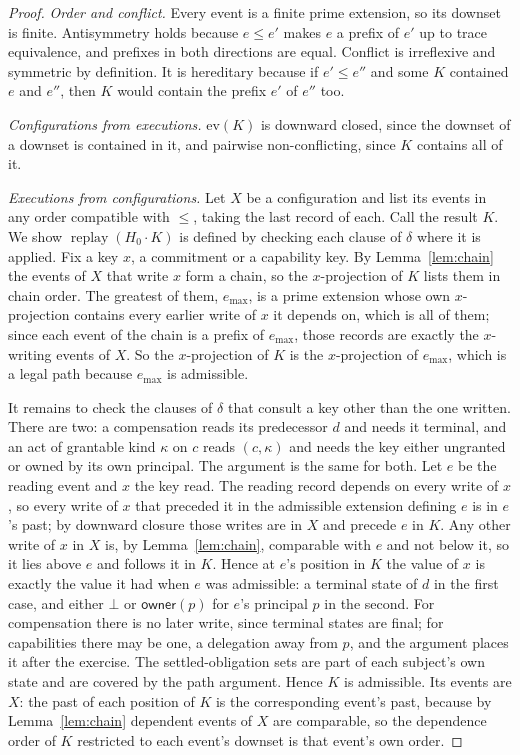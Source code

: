 \documentclass[11pt,openany]{book}
\theoremstyle{remark}
\newcommand{\replay}{\operatorname{replay}}
\begin{document}
\begin{proof}
\emph{Order and conflict.} Every event is a finite prime extension, so its
downset is finite. Antisymmetry holds because $e\le e'$ makes $e$ a
prefix of $e'$ up to trace equivalence, and prefixes in both directions
are equal. Conflict is irreflexive and symmetric by definition. It is
hereditary because if $e'\le e''$ and some $K$ contained $e$ and $e''$,
then $K$ would contain the prefix $e'$ of $e''$ too.

\emph{Configurations from executions.} $\mathrm{ev}(K)$ is downward closed,
since the downset of a downset is contained in it, and pairwise
non-conflicting, since $K$ contains all of it.

\emph{Executions from configurations.} Let $X$ be a configuration and
list its events in any order compatible with $\le$, taking the last
record of each. Call the result $K$. We show $\replay(H_0\cdot K)$ is
defined by checking each clause of $\delta$ where it is applied. Fix a
key $x$, a commitment or a capability key. By Lemma~\ref{lem:chain} the
events of $X$ that write $x$ form a chain, so the $x$-projection of $K$
lists them in chain order. The greatest of them, $e_{\max}$, is a prime
extension whose own $x$-projection contains every earlier write of $x$ it
depends on, which is all of them; since each event of the chain is a
prefix of $e_{\max}$, those records are exactly the $x$-writing events of
$X$. So the $x$-projection of $K$ is the $x$-projection of $e_{\max}$,
which is a legal path because $e_{\max}$ is admissible.

It remains to check the clauses of $\delta$ that consult a key other than
the one written. There are two: a compensation reads its predecessor $d$
and needs it terminal, and an act of grantable kind $\kappa$ on $c$
reads $(c,\kappa)$ and needs the key either ungranted or owned by its own
principal. The argument is the same for both. Let
$e$ be the reading event and $x$ the key read. The reading record depends
on every write of $x$, so every write of $x$ that preceded it in the
admissible extension defining $e$ is in $e$'s past; by downward closure
those writes are in $X$ and precede $e$ in $K$. Any other write of $x$ in
$X$ is, by Lemma~\ref{lem:chain}, comparable with $e$ and not below it, so
it lies above $e$ and follows it in $K$. Hence at $e$'s position in $K$ the
value of $x$ is exactly the value it had when $e$ was admissible: a
terminal state of $d$ in the first case, and either $\bot$ or
$\mathsf{owner}(p)$ for $e$'s principal $p$ in the second. For compensation there is no later write,
since terminal states are final; for capabilities there may be one, a
delegation away from $p$, and the argument places it after the exercise.
The settled-obligation sets are part of each subject's own state and are
covered by the path argument. Hence $K$ is admissible. Its events are
$X$: the past of each position of $K$ is the corresponding event's past,
because by Lemma~\ref{lem:chain} dependent events of $X$ are comparable,
so the dependence order of $K$ restricted to each event's downset is that
event's own order.


\end{proof}
\end{document}
